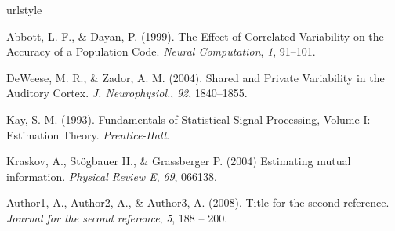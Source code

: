 \documentclass[12pt]{article}
\begin{document}
\begin{thebibliography}{100}
\providecommand{\natexlab}[1]{#1}
\expandafter\ifx\csname urlstyle\endcsname\relax
  \providecommand{\doi}[1]{doi:\discretionary{}{}{}#1}\else
  \providecommand{\doi}{doi:\discretionary{}{}{}\begingroup
  \urlstyle{rm}\Url}\fi

Abbott, L. F., \& Dayan, P. (1999).
\newblock The Effect of Correlated Variability on the Accuracy of a Population Code.
\newblock \emph{Neural Computation}, \emph{1}, 91--101.

DeWeese, M. R., \& Zador, A. M. (2004).
\newblock Shared and Private Variability in the Auditory Cortex.
\newblock \emph{J. Neurophysiol.}, \emph{92}, 1840--1855.

Kay, S. M. (1993).
\newblock Fundamentals of Statistical Signal Processing, Volume I: Estimation Theory.
\newblock \emph{Prentice-Hall}.

Kraskov, A., St{\"o}gbauer H., \& Grassberger P. (2004)
\newblock Estimating mutual information.
\newblock \emph{Physical Review E},
\emph{69}, 066138.

Author1, A., Author2, A., \& Author3, A. (2008).
\newblock Title for the second reference.
\newblock \emph{Journal for the second reference}, \emph{5}, 188 -- 200.

\end{thebibliography}
\end{document}
